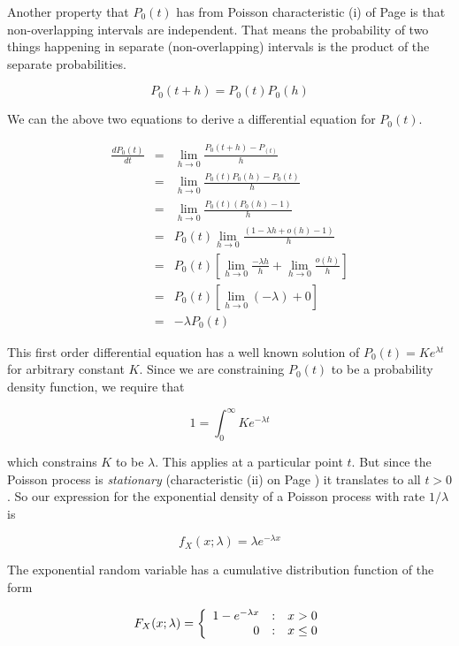 \documentclass[]{article}
\begin{document}
Another property that $P_0(t)$ has from Poisson characteristic
(i) of Page \pageref{poisson_properties} is that non-overlapping
intervals are independent.  That means the probability of two
things happening in separate (non-overlapping) intervals is the
product of the separate probabilities.

$$
P_0(t+h) = P_0(t)P_0(h)
$$

We can the above two equations to derive a differential equation
for $P_0(t)$.

\begin{eqnarray}
\frac{dP_0(t)}{dt} &= & \lim_{h \to 0} \frac{P_0(t+h) - P_(t)}{h} \nonumber \\
  &= & \lim_{h \to 0} \frac{P_0(t)P_0(h) - P_0(t)}{h} \nonumber \\
  &= & \lim_{h \to 0} \frac{P_0(t)(P_0(h) - 1)}{h} \nonumber \\
  &= & P_0(t)\lim_{h \to 0} \frac{(1 - \lambda h + o(h) - 1)}{h} \nonumber \\
  &= & P_0(t)\left[ \lim_{h \to 0} \frac{-\lambda h}{h} 
     + \lim_{h \to 0} \frac{o(h)}{h} \right] \nonumber \\
  &= & P_0(t)\left[ \lim_{h \to 0} (-\lambda)
     + 0 \right] \nonumber \\
  &= & -\lambda P_0(t) \label{exp_de}
\end{eqnarray}

This first order differential equation has a well known solution
of $P_0(t) = Ke^{\lambda t}$ for arbitrary constant $K$.  Since
we are constraining $P_0(t)$ to be a probability density function,
we require that

$$
1 = \int_0^{\infty} K e^{-\lambda t}
$$

which constrains $K$ to be $\lambda$.  This applies at a
particular point $t$.  But since the Poisson process is
\emph{stationary} 
(characteristic (ii) on Page \pageref{poisson_properties})
it translates to all $t > 0$.  So our expression for the
exponential density of a Poisson process with rate $1/\lambda$
is

\begin{equation} \label{exp_density}
f_X(x; \lambda) = \lambda e^{-\lambda x}
\end{equation}

The exponential random variable has a cumulative distribution
function of the form

\begin{equation} \label{exp_cdf}
F_X(x; \lambda) = \left\{ \begin{array}{r@{\quad:\quad}l}
   1 - e^{-\lambda x} & x > 0 \\
   0 & x \le 0
 \end{array} \right.
\end{equation}
\end{document}
